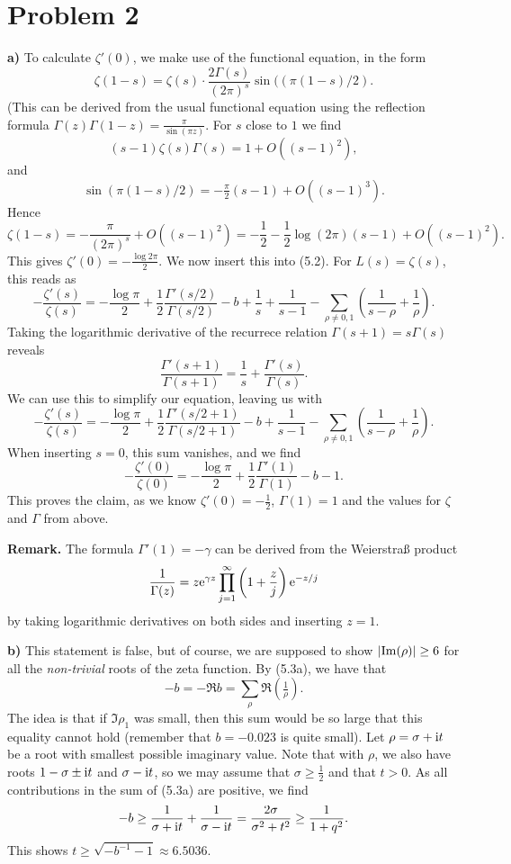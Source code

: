 \documentclass[a4paper,11pt]{article}
\begin{document}
\section*{Problem 2}
\textbf{a)}
To calculate $\zeta'(0)$, we make use of the functional equation, in the
form
\[
    \zeta(1-s) = \zeta(s) \cdot \frac{2\Gamma(s)}{(2\pi)^s} 
    \sin((\pi(1-s)/2).
\]
(This can be derived from the usual functional equation using the reflection formula
$\Gamma(z) \Gamma(1-z) = \frac \pi{\sin(\pi z)}$. For $s$ close to $1$ we find
\[
    (s-1)\zeta(s) \Gamma(s) = 1 + O((s-1)^2),
\]
and 
\[
    \sin(\pi(1-s)/2) = -\tfrac \pi 2 (s-1) + O((s-1)^3).
\]
Hence
\[
    \zeta(1-s) = - \frac{\pi}{(2\pi)^s} + O((s-1)^2) = 
    - \frac 12 - \frac 12 \log(2\pi) (s-1) + O((s-1)^2). 
\]
This gives $\zeta'(0) = - \frac{\log 2 \pi}2$.
We now insert this into (5.2). For $L(s) = \zeta(s)$, this reads as
\[
    - \frac{\zeta'(s)}{\zeta(s)} = - \frac{\log \pi}2 + \frac 12 \frac{\Gamma'(s/2)}
    {\Gamma(s/2)} - b + \frac 1s + \frac{1}{s-1} - \sum_{\rho \neq 0,1} 
    \left( \frac{1}{s-\rho} + \frac 1 \rho\right).
\]
Taking the logarithmic derivative of the recurrece relation $\Gamma(s+1) = s \Gamma(s)$ reveals
\[
    \frac{\Gamma'(s+1)}{\Gamma(s+1)} = \frac 1s + \frac{\Gamma'(s)}{\Gamma(s)}.
\]
We can use this to simplify our equation, leaving us with
\[
    -\frac{\zeta'(s)}{\zeta(s)} = -\frac{\log \pi}2 + \frac 12 \frac{\Gamma'(s/2+1)}{\Gamma(s/2 + 1)} - b + \frac {1}{s-1} - \sum_{\rho \neq 0,1} \left( \frac1{s-\rho} 
        + \frac 1 \rho \right ).
\]
When inserting $s=0$, this sum vanishes, and we find
\[
    -\frac{\zeta'(0)}{\zeta(0)} = -\frac{\log \pi}{2} + \frac 12 \frac{\Gamma'(1)}{\Gamma(1)} - b - 1.
\]
This proves the claim, as we know $\zeta'(0) = - \frac 12$, $\Gamma(1) = 1$ 
and the values for $\zeta$ and $\Gamma$ from above. 

\textbf{Remark.} The formula $\Gamma'(1) = -\gamma$ can be derived from
the Weierstraß product
\[
\frac 1 {\Gamma(z)} = z \mathrm e^{\gamma z} \prod_{j=1}^\infty\left(1+ \frac zj
\right) \mathrm e^{-z/j}
\]
by taking logarithmic derivatives on both sides and inserting $z=1$.

\textbf{b)} This statement is false, but of course, we are supposed to show 
$\left\lvert \operatorname{Im}(\rho)  \right\rvert \geq 6$ for all the \textit{non-trivial} roots of the zeta
function.
By (5.3a), we have that $$-b = -\Re b = \sum_\rho \Re(\tfrac 1 \rho).$$
The idea is that if $\Im \rho_1$ was small, then this sum would be so large that
this equality cannot hold (remember that $b = -0.023$ is quite small).
Let $\rho = \sigma + \mathrm i t$ be a root with smallest possible imaginary value.
Note that with $\rho$, we also have roots $1-\sigma \pm \mathrm i t$ and $\sigma - \mathrm i t$,
so we may assume that $\sigma \geq \frac 12$ and that $t > 0$. As all
contributions in the sum of (5.3a) are positive, we find
\[
    -b \geq \frac 1{\sigma + \mathrm i t} + \frac1{\sigma - \mathrm i t} =
    \frac{2 \sigma}{\sigma^2 + t^2} \geq \frac 1{1+q^2}.
\]
This shows $t \geq \sqrt{-b^{-1}-1} \approx 6.5036$. 
\end{document}
